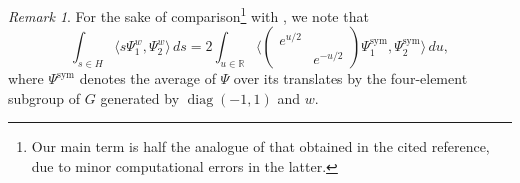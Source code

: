 \documentclass[reqno,10pt]{amsart}
\theoremstyle{plain} %
\theoremstyle{definition}
\theoremstyle{plain} %
\theoremstyle{remark}
\newtheorem{remark}             {Remark}
\theoremstyle{itplain} %
\theoremstyle{remark} %
\numberwithin{equation}{section}
\DeclareMathOperator{\diag}{diag}
\DeclareMathOperator{\sym}{sym}
\begin{document}
\begin{remark}\label{rmk:involving-sym}
  For the sake of comparison\footnote{
    Our main term is half the analogue of that obtained in the cited reference, due to minor computational errors in the latter.
  }
  with \cite{2013arXiv1303.6972S}, we note that
  \begin{equation}\label{eq:weyl-inv}
    \int_{s \in H}
    \langle s \Psi_1^w, \Psi_2^w \rangle \,d s 
    =
    2
    \int_{u \in \mathbb{R}}
    \langle \begin{pmatrix}
      e^{u/2} &  \\
      & e^{-u/2}
    \end{pmatrix} \Psi_1^{\sym}, \Psi_{2}^{\sym} \rangle \, d u,
  \end{equation}
  where $\Psi^{\sym}$ denotes the average of $\Psi$ over its translates by the four-element subgroup of $G$ generated by $\diag(-1,1)$ and $w$.
\end{remark}
\end{document}
